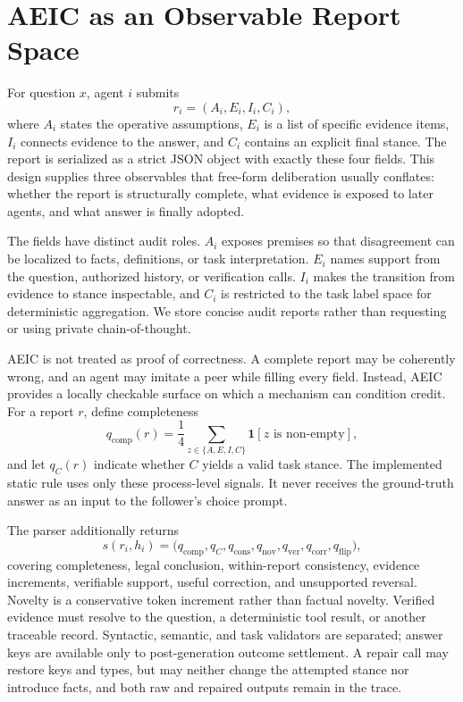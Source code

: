 \section{AEIC as an Observable Report Space}
\label{sec:aeic}

For question $x$, agent $i$ submits
\begin{equation}
 r_i=(A_i,E_i,I_i,C_i),
\end{equation}
where $A_i$ states the operative assumptions, $E_i$ is a list of specific evidence items, $I_i$ connects evidence to the answer, and $C_i$ contains an explicit final stance. The report is serialized as a strict JSON object with exactly these four fields. This design supplies three observables that free-form deliberation usually conflates: whether the report is structurally complete, what evidence is exposed to later agents, and what answer is finally adopted.

The fields have distinct audit roles. $A_i$ exposes premises so that disagreement can be localized to facts, definitions, or task interpretation. $E_i$ names support from the question, authorized history, or verification calls. $I_i$ makes the transition from evidence to stance inspectable, and $C_i$ is restricted to the task label space for deterministic aggregation. We store concise audit reports rather than requesting or using private chain-of-thought.

AEIC is not treated as proof of correctness. A complete report may be coherently wrong, and an agent may imitate a peer while filling every field. Instead, AEIC provides a locally checkable surface on which a mechanism can condition credit. For a report $r$, define completeness
\begin{equation}
 q_{\mathrm{comp}}(r)=\frac{1}{4}\sum_{z\in\{A,E,I,C\}}\mathbf{1}[z\text{ is non-empty}],
\end{equation}
and let $q_C(r)$ indicate whether $C$ yields a valid task stance. The implemented static rule uses only these process-level signals. It never receives the ground-truth answer as an input to the follower's choice prompt.

The parser additionally returns
\begin{equation}
s(r_i,h_i)=\big(q_{\mathrm{comp}},q_C,q_{\mathrm{cons}},q_{\mathrm{nov}},q_{\mathrm{ver}},q_{\mathrm{corr}},q_{\mathrm{flip}}\big),
\end{equation}
covering completeness, legal conclusion, within-report consistency, evidence increments, verifiable support, useful correction, and unsupported reversal. Novelty is a conservative token increment rather than factual novelty. Verified evidence must resolve to the question, a deterministic tool result, or another traceable record. Syntactic, semantic, and task validators are separated; answer keys are available only to post-generation outcome settlement. A repair call may restore keys and types, but may neither change the attempted stance nor introduce facts, and both raw and repaired outputs remain in the trace.


